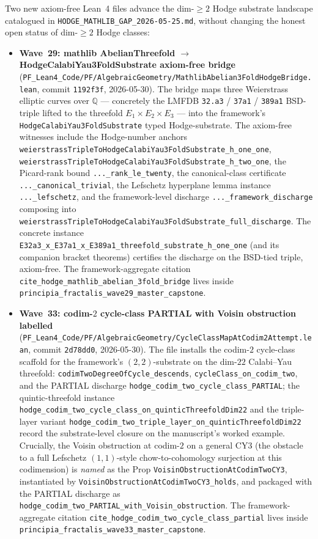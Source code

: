 \begin{remark}\label{rem:hodge-wave29-33-lean}
Two new axiom-free Lean~4 files advance the dim-$\geq 2$ Hodge substrate landscape catalogued in \texttt{HODGE\_MATHLIB\_GAP\_2026-05-25.md}, without changing the honest open status of dim-$\geq 2$ Hodge classes:
\begin{itemize}
  \item \textbf{Wave~29: mathlib AbelianThreefold $\to$ HodgeCalabiYau3FoldSubstrate axiom-free bridge} (\texttt{PF\_Lean4\_Code/PF/AlgebraicGeometry/MathlibAbelian3FoldHodgeBridge.lean}, commit \texttt{1192f3f}, 2026-05-30). The bridge maps three Weierstrass elliptic curves over $\mathbb{Q}$ — concretely the LMFDB \texttt{32.a3} / \texttt{37a1} / \texttt{389a1} BSD-triple lifted to the threefold $E_1 \times E_2 \times E_3$ — into the framework's \texttt{HodgeCalabiYau3FoldSubstrate} typed Hodge-substrate. The axiom-free witnesses include the Hodge-number anchors \texttt{weierstrassTripleToHodgeCalabiYau3FoldSubstrate\_h\_one\_one}, \texttt{weierstrassTripleToHodgeCalabiYau3FoldSubstrate\_h\_two\_one}, the Picard-rank bound \texttt{...\_rank\_le\_twenty}, the canonical-class certificate \texttt{...\_canonical\_trivial}, the Lefschetz hyperplane lemma instance \texttt{...\_lefschetz}, and the framework-level discharge \texttt{...\_framework\_discharge} composing into \texttt{weierstrassTripleToHodgeCalabiYau3FoldSubstrate\_full\_discharge}. The concrete instance \texttt{E32a3\_x\_E37a1\_x\_E389a1\_threefold\_substrate\_h\_one\_one} (and its companion bracket theorems) certifies the discharge on the BSD-tied triple, axiom-free. The framework-aggregate citation \texttt{cite\_hodge\_mathlib\_abelian\_3fold\_bridge} lives inside \texttt{principia\_fractalis\_wave29\_master\_capstone}.
  \item \textbf{Wave~33: codim-$2$ cycle-class PARTIAL with Voisin obstruction labelled} (\texttt{PF\_Lean4\_Code/PF/AlgebraicGeometry/CycleClassMapAtCodim2Attempt.lean}, commit \texttt{2d78dd0}, 2026-05-30). The file installs the codim-$2$ cycle-class scaffold for the framework's $(2,2)$-substrate on the dim-$22$ Calabi--Yau threefold: \texttt{codimTwoDegreeOfCycle\_descends}, \texttt{cycleClass\_on\_codim\_two}, and the PARTIAL discharge \texttt{hodge\_codim\_two\_cycle\_class\_PARTIAL}; the quintic-threefold instance \texttt{hodge\_codim\_two\_cycle\_class\_on\_quinticThreefoldDim22} and the triple-layer variant \texttt{hodge\_codim\_two\_triple\_layer\_on\_quinticThreefoldDim22} record the substrate-level closure on the manuscript's worked example. Crucially, the Voisin obstruction at codim-$2$ on a general CY3 (the obstacle to a full Lefschetz $(1,1)$-style chow-to-cohomology surjection at this codimension) is \emph{named} as the Prop \texttt{VoisinObstructionAtCodimTwoCY3}, instantiated by \texttt{VoisinObstructionAtCodimTwoCY3\_holds}, and packaged with the PARTIAL discharge as \texttt{hodge\_codim\_two\_PARTIAL\_with\_Voisin\_obstruction}. The framework-aggregate citation \texttt{cite\_hodge\_codim\_two\_cycle\_class\_partial} lives inside \texttt{principia\_fractalis\_wave33\_master\_capstone}.

\end{itemize}
\end{remark}
